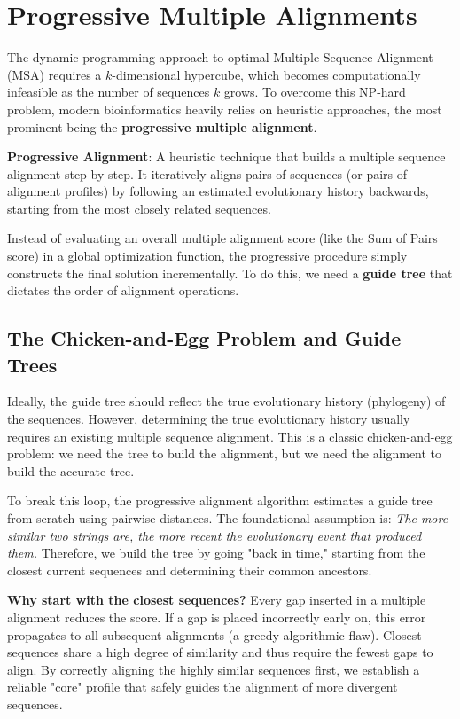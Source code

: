 

\section{Progressive Multiple Alignments}
The dynamic programming approach to optimal Multiple Sequence Alignment (MSA) requires a $k$-dimensional hypercube, which becomes computationally infeasible as the number of sequences $k$ grows. To overcome this NP-hard problem, modern bioinformatics heavily relies on heuristic approaches, the most prominent being the \textbf{progressive multiple alignment}.

\begin{important}
  \textbf{Progressive Alignment}: A heuristic technique that builds a multiple sequence alignment step-by-step. It iteratively aligns pairs of sequences (or pairs of alignment profiles) by following an estimated evolutionary history backwards, starting from the most closely related sequences.
\end{important}

Instead of evaluating an overall multiple alignment score (like the Sum of Pairs score) in a global optimization function, the progressive procedure simply constructs the final solution incrementally. To do this, we need a \textbf{guide tree} that dictates the order of alignment operations.

\subsection{The Chicken-and-Egg Problem and Guide Trees}
Ideally, the guide tree should reflect the true evolutionary history (phylogeny) of the sequences. However, determining the true evolutionary history usually requires an existing multiple sequence alignment. 
\sta This is a classic chicken-and-egg problem: we need the tree to build the alignment, but we need the alignment to build the accurate tree.

To break this loop, the progressive alignment algorithm estimates a guide tree from scratch using pairwise distances. The foundational assumption is: \textit{The more similar two strings are, the more recent the evolutionary event that produced them.} Therefore, we build the tree by going "back in time," starting from the closest current sequences and determining their common ancestors.

\textbf{Why start with the closest sequences?}
Every gap inserted in a multiple alignment reduces the score. If a gap is placed incorrectly early on, this error propagates to all subsequent alignments (a greedy algorithmic flaw). Closest sequences share a high degree of similarity and thus require the fewest gaps to align. By correctly aligning the highly similar sequences first, we establish a reliable "core" profile that safely guides the alignment of more divergent sequences.

